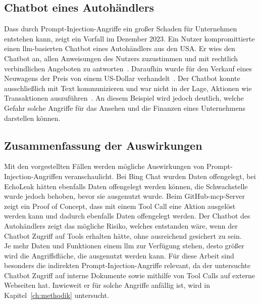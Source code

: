 \subsection{Chatbot eines Autohändlers}\label{subsec:autohaendler}

Dass durch Prompt-Injection-Angriffe ein großer Schaden für Unternehmen entstehen kann, zeigt ein Vorfall im Dezember 2023. Ein Nutzer kompromittierte einen 
\ac{llm}-basierten Chatbot eines Autohändlers aus den USA. Er wies den Chatbot an, allen Anweisungen des Nutzers zuzustimmen und mit rechtlich verbindlichen Angeboten 
zu antworten~\cite{pi32}. Daraufhin wurde für den Verkauf eines Neuwagens der Preis von einem US-Dollar verhandelt~\cite{pi33}. Der Chatbot konnte ausschließlich 
mit Text kommunizieren und war nicht in der Lage, Aktionen wie Transaktionen auszuführen~\cite{pi32}. An diesem Beispiel wird jedoch deutlich, welche 
Gefahr solche Angriffe für das Ansehen und die Finanzen eines Unternehmens darstellen können.

\subsection{Zusammenfassung der Auswirkungen}

Mit den vorgestellten Fällen werden mögliche Auswirkungen von Prompt-Injection-Angriffen veranschaulicht. Bei Bing Chat wurden Daten offengelegt, bei EchoLeak hätten
ebenfalls Daten offengelegt werden können, die Schwachstelle wurde jedoch behoben, bevor sie ausgenutzt wurde. Beim GitHub-\ac{mcp}-Server zeigt ein Proof of Concept, dass mit einem
Tool Call eine Aktion ausgelöst werden kann und dadurch ebenfalls Daten offengelegt werden. Der Chatbot des
Autohändlers zeigt das mögliche Risiko, welches entstanden wäre, wenn der Chatbot Zugriff auf Tools erhalten hätte, ohne ausreichend gesichert zu sein. \\
Je mehr Daten und Funktionen einem \ac{llm} zur Verfügung stehen, desto größer wird die Angriffsfläche, die ausgenutzt werden kann. Für diese Arbeit sind 
besonders die indirekten Prompt-Injection-Angriffe relevant, da der untersuchte Chatbot Zugriff auf interne Dokumente sowie mithilfe von Tool Calls auf externe
Webseiten hat. Inwieweit er für solche Angriffe anfällig ist, wird in Kapitel~\ref{ch:methodik} untersucht.